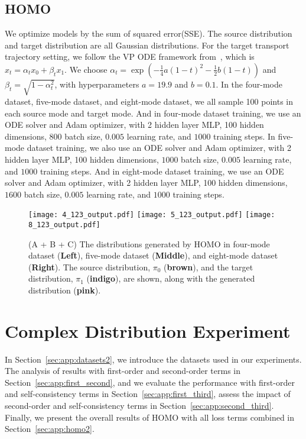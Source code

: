\subsection{HOMO}\label{sec:app:homo}
We optimize models by the sum of squared error(SSE). The source distribution and target distribution are all Gaussian distributions. For the target transport trajectory setting, we follow the VP ODE framework from~\cite{rectified_flow}, which is $x_t = \alpha_t x_0 + \beta_t x_1$. We choose $\alpha_t = \exp(-\frac{1}{4} a(1-t)^2 - \frac{1}{2} b(1-t))$ and $\beta_t = \sqrt{1 - \alpha_t^2}$, with hyperparameters $a = 19.9$ and $b = 0.1$. In the four-mode dataset, five-mode dataset, and eight-mode dataset, we all sample 100 points in each source mode and target mode. And in four-mode dataset training, we use an ODE solver and Adam optimizer, with 2 hidden layer MLP, 100 hidden dimensions, $800$ batch size, $0.005$ learning rate, and $1000$ training steps. In five-mode dataset training, we also use an ODE solver and Adam optimizer, with 2 hidden layer MLP, 100 hidden dimensions, $1000$ batch size, $0.005$ learning rate, and $1000$ training steps. And in eight-mode dataset training, we use an ODE solver and Adam optimizer, with 2 hidden layer MLP, 100 hidden dimensions, $1600$ batch size, $0.005$ learning rate, and $1000$ training steps. 
\begin{figure}[!ht]
\centering
\texttt{[image: 4\_123\_output.pdf]}
\texttt{[image: 5\_123\_output.pdf]}
\texttt{[image: 8\_123\_output.pdf]}
\caption{
(A + B + C) The distributions generated by HOMO in four-mode dataset (\textbf{Left}), five-mode dataset (\textbf{Middle}), and eight-mode dataset (\textbf{Right}). 
The source distribution, $\pi_0$ ({\textbf{brown}}), and the target distribution, $\pi_1$ ({\textbf{indigo}}), are shown, along with the generated distribution ({\textbf{pink}}). 
}
\label{fig:123_distribution}
\end{figure}


\section{Complex Distribution Experiment}\label{sec:app:complex_distribution_experiment}
In Section~\ref{sec:app:datasets2}, we introduce the datasets used in our experiments. The analysis of results with first-order and second-order terms in Section~\ref{sec:app:first_second}, and we evaluate the performance with first-order and self-consistency terms in Section~\ref{sec:app:first_third}, assess the impact of second-order and self-consistency terms in Section~\ref{sec:app:second_third}. Finally, we present the overall results of HOMO with all loss terms combined in Section~\ref{sec:app:homo2}.

